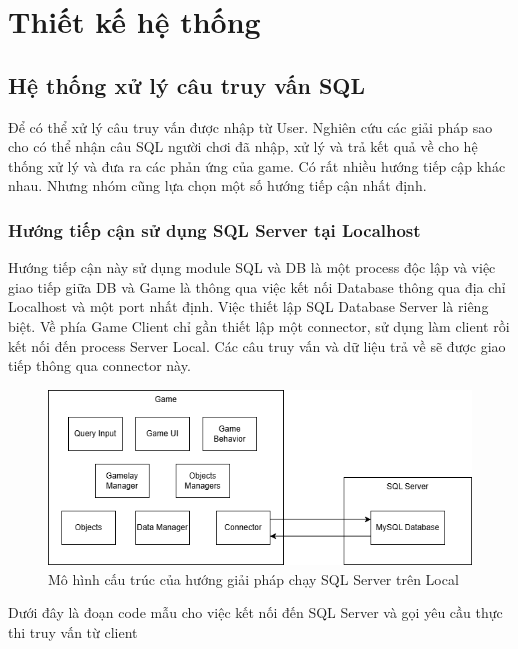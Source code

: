 \section{Thiết kế hệ thống}
\subsection{Hệ thống xử lý câu truy vấn SQL}
\hspace*{1cm} Để có thể xử lý câu truy vấn được nhập từ User. Nghiên cứu các giải pháp sao cho có thể nhận câu SQL người chơi đã nhập, xử lý và trả kết quả về cho hệ thống xử lý và đưa ra các phản ứng của game. Có rất nhiều hướng tiếp cập khác nhau. Nhưng nhóm cũng lựa chọn một số hướng tiếp cận nhất định.
\subsubsection{Hướng tiếp cận sử dụng SQL Server tại Localhost}
\hspace*{1cm} Hướng tiếp cận này sử dụng module SQL và DB là một process độc lập và việc giao tiếp giữa DB và Game là thông qua việc kết nối Database thông qua địa chỉ Localhost và một port nhất định. Việc thiết lập SQL Database Server là riêng biệt. Về phía Game Client chỉ gần thiết lập một connector, sử dụng làm client rồi kết nối đến process Server Local. Các câu truy vấn và dữ liệu trả về sẽ được giao tiếp thông qua connector này.
\begin{figure}[H]
	\centering
	\includegraphics[width=\textwidth]{Images/SQLLocalServer.png}
	\vspace{0.5cm}
	\caption{Mô hình cấu trúc của hướng giải pháp chạy SQL Server trên Local}
\end{figure}
Dưới đây là đoạn code mẫu cho việc kết nối đến SQL Server và gọi yêu cầu thực thi truy vấn từ client\\
